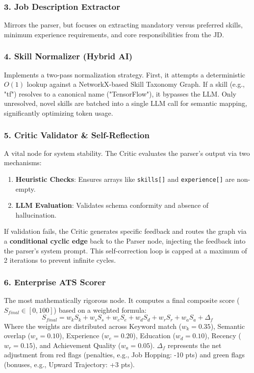\documentclass[10pt,journal,compsoc]{IEEEtran}
\begin{document}
\subsubsection{3. Job Description Extractor}
Mirrors the parser, but focuses on extracting mandatory versus preferred skills, minimum experience requirements, and core responsibilities from the JD.

\subsubsection{4. Skill Normalizer (Hybrid AI)}
Implements a two-pass normalization strategy. First, it attempts a deterministic $O(1)$ lookup against a NetworkX-based Skill Taxonomy Graph. If a skill (e.g., "tf") resolves to a canonical name ("TensorFlow"), it bypasses the LLM. Only unresolved, novel skills are batched into a single LLM call for semantic mapping, significantly optimizing token usage.

\subsubsection{5. Critic Validator \& Self-Reflection}
A vital node for system stability. The Critic evaluates the parser's output via two mechanisms:
\begin{enumerate}
    \item \textbf{Heuristic Checks}: Ensures arrays like \texttt{skills[]} and \texttt{experience[]} are non-empty.
    \item \textbf{LLM Evaluation}: Validates schema conformity and absence of hallucination.
\end{enumerate}
If validation fails, the Critic generates specific feedback and routes the graph via a \textbf{conditional cyclic edge} back to the Parser node, injecting the feedback into the parser's system prompt. This self-correction loop is capped at a maximum of 2 iterations to prevent infinite cycles.

\subsubsection{6. Enterprise ATS Scorer}
The most mathematically rigorous node. It computes a final composite score ($S_{final} \in [0, 100]$) based on a weighted formula:
\begin{equation}
    S_{final} = w_k S_k + w_s S_s + w_e S_e + w_d S_d + w_r S_r + w_a S_a + \Delta_f
\end{equation}
Where the weights are distributed across Keyword match ($w_k = 0.35$), Semantic overlap ($w_s = 0.10$), Experience ($w_e = 0.20$), Education ($w_d = 0.10$), Recency ($w_r = 0.15$), and Achievement Quality ($w_a = 0.05$). $\Delta_f$ represents the net adjustment from red flags (penalties, e.g., Job Hopping: -10 pts) and green flags (bonuses, e.g., Upward Trajectory: +3 pts).
\end{document}
